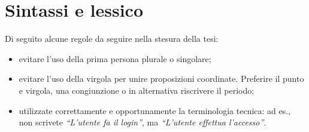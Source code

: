 \section{Sintassi e lessico}

Di seguito alcune regole da seguire nella stesura della tesi:
\begin{itemize}
 \item evitare l'uso della prima persona plurale o singolare;
 \item evitare l'uso della virgola per unire proposizioni coordinate. Preferire il punto e virgola, una congiunzione o in alternativa riscrivere il periodo;
 \item utilizzate correttamente e opportunamente la terminologia tecnica: ad es., non scrivete \emph{``L'utente fa il login''}, ma \emph{``L'utente effettua l'accesso''}.
\end{itemize}